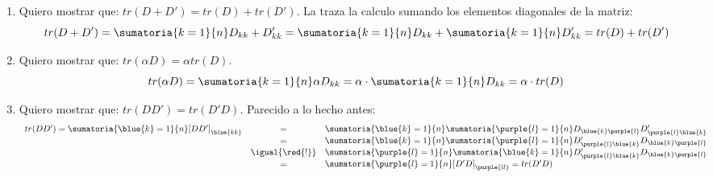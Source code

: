 \begin{enumerate}[label=(\alph*)]
  \item Quiero mostrar que: $tr(D + D') = tr(D) + tr(D')$.
        La traza la calculo sumando los elementos diagonales de la matriz:
        $$
          tr(D + D') =
          \sumatoria{k = 1}{n} D_{kk} + D'_{kk} =
          \sumatoria{k = 1}{n}D_{kk} +
          \sumatoria{k = 1}{n}D'_{kk} =
          tr(D) + tr(D')
        $$

  \item Quiero mostrar que: $tr(\alpha D) = \alpha tr(D)$.
        $$
          tr(\alpha D) =
          \sumatoria{k = 1}{n} \alpha D_{kk} =
          \alpha \cdot \sumatoria{k = 1}{n}D_{kk} =
          \alpha \cdot tr(D)
        $$

  \item Quiero mostrar que: $tr(DD') = tr(D'D)$. Parecido a lo hecho antes:
        $$
          \begin{array}{rcl}
            tr(DD') =
            \sumatoria{\blue{k} = 1}{n} [DD']_{\blue{kk}} & =               &
            \sumatoria{\blue{k} = 1}{n}
            \sumatoria{\purple{l} = 1}{n} D_{\blue{k}\purple{l}}D'_{\purple{l}\blue{k}} \\
                                                          & =               &
            \sumatoria{\blue{k} = 1}{n}
            \sumatoria{\purple{l} = 1}{n} D'_{\purple{l}\blue{k}}D_{\blue{k}\purple{l}} \\
                                                          & \igual{\red{!}} &
            \sumatoria{\purple{l} = 1}{n}
            \sumatoria{\blue{k} = 1}{n} D'_{\purple{l}\blue{k}}D_{\blue{k}\purple{l}}   \\
                                                          & =               &
            \sumatoria{\purple{l} = 1}{n} [D'D]_{\purple{ll}}  = tr(D'D)
          \end{array}
        $$

\end{enumerate}

\begin{aportes}
  \item {}
\end{aportes}
